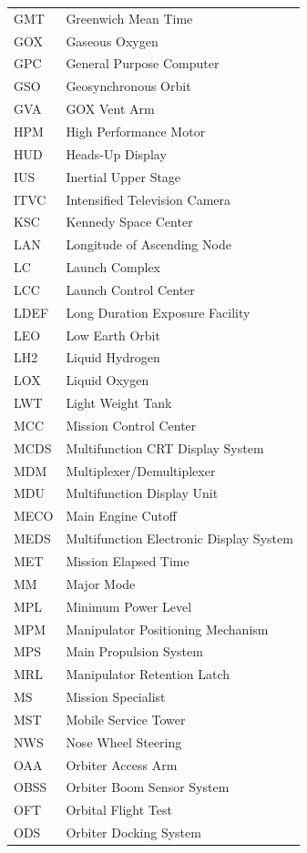 \documentclass[Space_Shuttle_Vessel_Manual.tex]{subfiles}
\begin{document}
\begin{longtable}{l l }
GMT & Greenwich Mean Time\\
GOX & Gaseous Oxygen\\
GPC & General Purpose Computer\\
GSO & Geosynchronous Orbit\\
GVA & GOX Vent Arm\\
HPM & High Performance Motor\\
HUD & Heads-Up Display\\
IUS & Inertial Upper Stage\\
ITVC & Intensified Television Camera\\
KSC & Kennedy Space Center\\
LAN & Longitude of Ascending Node\\
LC & Launch Complex\\
LCC & Launch Control Center\\
LDEF & Long Duration Exposure Facility\\
LEO & Low Earth Orbit\\
LH2 & Liquid Hydrogen\\
LOX & Liquid Oxygen\\
LWT & Light Weight Tank\\
MCC & Mission Control Center\\
MCDS & Multifunction CRT Display System\\
MDM & Multiplexer/Demultiplexer\\
MDU & Multifunction Display Unit\\
MECO & Main Engine Cutoff\\
MEDS & Multifunction Electronic Display System\\
MET & Mission Elapsed Time\\
MM & Major Mode\\
MPL & Minimum Power Level\\
MPM & Manipulator Positioning Mechanism\\
MPS & Main Propulsion System\\
MRL & Manipulator Retention Latch\\
MS & Mission Specialist\\
MST & Mobile Service Tower\\
NWS & Nose Wheel Steering\\
OAA & Orbiter Access Arm\\
OBSS & Orbiter Boom Sensor System\\
OFT & Orbital Flight Test\\
ODS & Orbiter Docking System\\

\end{longtable}
\end{document}
